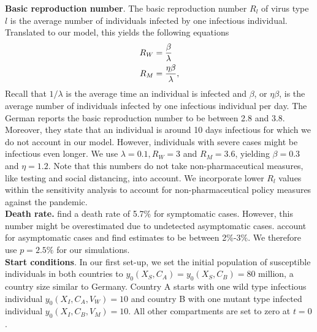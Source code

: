 \textbf{Basic reproduction number}. The basic reproduction number $R_l$ of virus type $l$ is the average number of individuals infected by one infectious individual. Translated to our model, this yields the following equations 
\begin{align}
R_W &= \frac{\beta}{\lambda} \\
R_M &= \frac{\eta \beta}{\lambda}, \notag
\end{align}
Recall that $1/\lambda$ is the average time an individual is infected and $\beta$, or $\eta \beta$, is the average number of individuals infected by one infectious individual per day. The German \cite{RKI.2021} reports the basic reproduction number to be between 2.8 and 3.8. Moreover, they state that an individual is around 10 days infectious for which we do not account in our model. However, individuals with severe cases might be infectious even longer. We use $\lambda = 0.1, R_W = 3$ and $R_M = 3.6$, yielding $\beta = 0.3$ and $\eta = 1.2$. Note that this numbers do not take non-pharmaceutical measures, like testing and social distancing, into account. We incorporate lower $R_l$ values within the sensitivity analysis to account for non-pharmaceutical policy measures against the pandemic. \\

\textbf{Death rate.} \cite{Baud.2020} find a death rate of 5.7\% for symptomatic cases. However, this number might be overestimated due to undetected asymptomatic cases. \cite{Wu.2020} account for asymptomatic cases and find estimates to be between 2\%-3\%. We therefore use $p=2.5\%$ for our simulations.\\

\textbf{Start conditions}. In our first set-up, we set the initial population of susceptible individuals in both countries to $y_0(X_S, C_A) = y_0(X_S, C_B) = 80$ million, a country size similar to Germany. Country A starts with one wild type infectious individual $y_0(X_I, C_A, V_W) = 10$ and country B with one mutant type infected individual $y_0(X_I, C_B, V_M) = 10$. All other compartments are set to zero at $t=0$. \\

